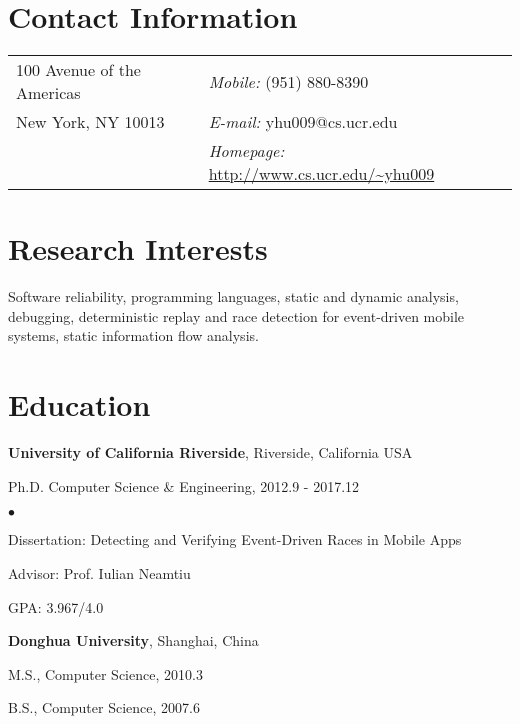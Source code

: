 \documentclass[margin,line]{res}
\newenvironment{list1}{
  \begin{list}{\ding{113}}{%
      \setlength{\itemsep}{0in}
      \setlength{\parsep}{0in} \setlength{\parskip}{0in}
      \setlength{\topsep}{0in} \setlength{\partopsep}{0in} 
      \setlength{\leftmargin}{0.17in}}}{\end{list}}
\newenvironment{list2}{
  \begin{list}{$\bullet$}{%
      \setlength{\itemsep}{0in}
      \setlength{\parsep}{0in} \setlength{\parskip}{0in}
      \setlength{\topsep}{0in} \setlength{\partopsep}{0in} 
      \setlength{\leftmargin}{0.2in}}}{\end{list}}
\begin{document}

\begin{resume}
\section{\sc Contact Information}
\vspace{.05in}
\begin{tabular}{@{}p{2in}p{4in}}
100 Avenue of the Americas              & {\it Mobile:}  (951) 880-8390 \\
New York, NY 10013                      & {\it E-mail:}  yhu009@cs.ucr.edu\\
                                        & {\it Homepage:} \url{http://www.cs.ucr.edu/~yhu009}\\
\end{tabular}


\section{\sc Research Interests}
Software reliability, programming languages, static and dynamic analysis, 
debugging, deterministic replay and race detection for event-driven mobile systems, 
static information flow analysis.


\section{\sc Education}
{\bf University of California Riverside}, Riverside, California USA\\
\vspace*{-.1in}
\begin{list1}
\item[] Ph.D. Computer Science \& Engineering, 2012.9 - 2017.12
\begin{list2}
\vspace*{.05in}
\item Dissertation: Detecting and Verifying Event-Driven Races in Mobile Apps
\item Advisor:  Prof. Iulian Neamtiu
\item GPA: 3.967/4.0
\end{list2}
\end{list1}

{\bf Donghua University}, Shanghai, China\\
\vspace*{-.1in}
\begin{list1}
\item[] M.S., Computer Science,  2010.3
\item[] B.S., Computer Science,  2007.6
\end{list1}



\end{resume}
\end{document}
